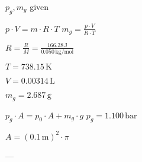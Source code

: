 \( p_g, m_g \) given  

\( p \cdot V = m \cdot R \cdot T \)  
\( m_g = \frac{p \cdot V}{R \cdot T} \)  

\( R = \frac{R}{M} = \frac{166.28 \, \text{J}}{0.050 \, \text{kg/mol}} \)  

\( T = 738.15 \, \text{K} \)  

\( V = 0.00314 \, \text{L} \)  

\( m_g = 2.687 \, \text{g} \)  

\( p_g \cdot A = p_0 \cdot A + m_g \cdot g \)  
\( p_g = 1.100 \, \text{bar} \)  

\( A = (0.1 \, \text{m})^2 \cdot \pi \)  

---